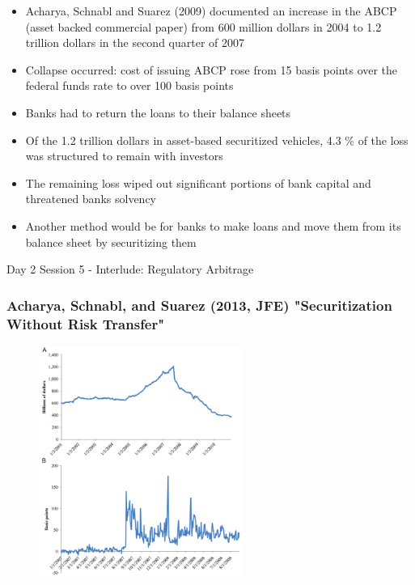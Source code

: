 \documentclass[11pt]{beamer}
\begin{document}
\begin{frame}
\begin{itemize}
\item Acharya, Schnabl and Suarez (2009) documented an increase in the ABCP (asset backed commercial paper) from 600 million dollars in 2004 to 1.2 trillion dollars in the second quarter of 2007
\item Collapse occurred: cost of issuing ABCP rose from 15 basis points over the federal funds rate to over 100 basis points
\item Banks had to return the loans to their balance sheets
\item Of the 1.2 trillion dollars in asset-based securitized vehicles, 4.3 \% of the loss was structured to remain with investors
\item The remaining loss wiped out significant portions of bank capital and threatened banks solvency
\item Another method would be for banks to make loans and move them from its balance sheet by securitizing them
\end{itemize}
\end{frame}
%
\begin{frame}
\begin{center}
{\Large Day 2 Session 5 - Interlude: Regulatory Arbitrage}
\end{center}
\end{frame}

\begin{frame}
	\frametitle{Acharya, Schnabl, and Suarez (2013, JFE) "Securitization Without Risk Transfer"}
    \begin{figure}
    	\begin{center}
    	\includegraphics[width=0.6\textwidth]{Figures/ASS2013_Figure1.png}
        \end{center}
    \end{figure}
\end{frame}
\end{document}
